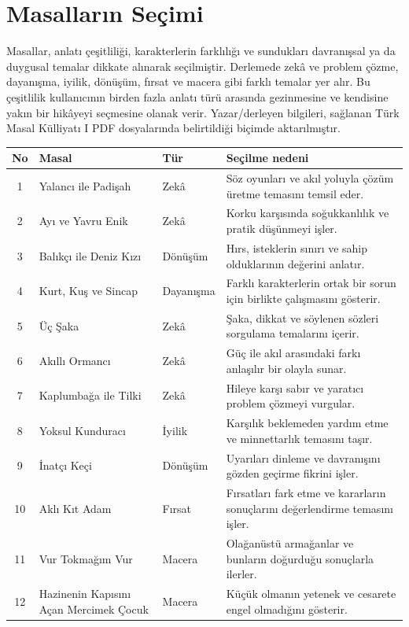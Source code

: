 \documentclass[12pt,a4paper]{article}
\begin{document}
\section{Masalların Seçimi}
Masallar, anlatı çeşitliliği, karakterlerin farklılığı ve sundukları davranışsal ya da duygusal temalar dikkate alınarak seçilmiştir. Derlemede zekâ ve problem çözme, dayanışma, iyilik, dönüşüm, fırsat ve macera gibi farklı temalar yer alır. Bu çeşitlilik kullanıcının birden fazla anlatı türü arasında gezinmesine ve kendisine yakın bir hikâyeyi seçmesine olanak verir. Yazar/derleyen bilgileri, sağlanan Türk Masal Külliyatı I PDF dosyalarında belirtildiği biçimde aktarılmıştır.

\begin{longtable}{@{}cp{4cm}p{3cm}p{5.4cm}@{}}
\toprule
\textbf{No} & \textbf{Masal} & \textbf{Tür} & \textbf{Seçilme nedeni} \\
\midrule
\endhead
1 & Yalancı ile Padişah & Zekâ & Söz oyunları ve akıl yoluyla çözüm üretme temasını temsil eder. \\
2 & Ayı ve Yavru Enik & Zekâ & Korku karşısında soğukkanlılık ve pratik düşünmeyi işler. \\
3 & Balıkçı ile Deniz Kızı & Dönüşüm & Hırs, isteklerin sınırı ve sahip olduklarının değerini anlatır. \\
4 & Kurt, Kuş ve Sincap & Dayanışma & Farklı karakterlerin ortak bir sorun için birlikte çalışmasını gösterir. \\
5 & Üç Şaka & Zekâ & Şaka, dikkat ve söylenen sözleri sorgulama temalarını içerir. \\
6 & Akıllı Ormancı & Zekâ & Güç ile akıl arasındaki farkı anlaşılır bir olayla sunar. \\
7 & Kaplumbağa ile Tilki & Zekâ & Hileye karşı sabır ve yaratıcı problem çözmeyi vurgular. \\
8 & Yoksul Kunduracı & İyilik & Karşılık beklemeden yardım etme ve minnettarlık temasını taşır. \\
9 & İnatçı Keçi & Dönüşüm & Uyarıları dinleme ve davranışını gözden geçirme fikrini işler. \\
10 & Aklı Kıt Adam & Fırsat & Fırsatları fark etme ve kararların sonuçlarını değerlendirme temasını işler. \\
11 & Vur Tokmağım Vur & Macera & Olağanüstü armağanlar ve bunların doğurduğu sonuçlarla ilerler. \\
12 & Hazinenin Kapısını Açan Mercimek Çocuk & Macera & Küçük olmanın yetenek ve cesarete engel olmadığını gösterir. \\
\bottomrule
\end{longtable}
\end{document}
